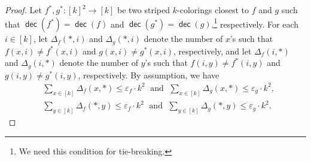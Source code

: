 \documentclass[11pt,fleqn]{article}
\renewcommand{\leq}{\leqslant}
\renewcommand{\epsilon}{\varepsilon}
\DeclareMathOperator{\dec}{\mathsf{dec}}
\newcommand{\f}{f}
\newcommand{\g}{g}
\theoremstyle{definition}
\numberwithin{equation}{section}
\begin{document}
\begin{proof} Let $\f^*, \g^* \colon [k]^2 \to [k]$ be two striped $k$-colorings
closest to $\f$ and $\g$ such that
$\dec(\f^*) = \dec(\f)$ and $\dec(\g^*) = \dec(\g)$,\footnote{
We need this condition for tie-breaking.
} respectively.
For each $i \in [k]$, let
    $\Delta_{\f}(*, i)$ and $\Delta_{\g}(*, i)$
    denote the number of $x$'s such that
    $\f(x,i) \neq \f^*(x,i)$ and $\g(x,i) \neq \g^*(x,i)$, respectively, and
    let
    $\Delta_{\f}(i,*)$ and $\Delta_{\g}(i,*)$
    denote the number of $y$'s such that
    $\f(i,y) \neq \f^*(i,y)$ and $\g(i,y) \neq \g^*(i,y)$, respectively.
By assumption, we have
\begin{align}
    & \sum_{x \in [k]} \Delta_{\f}(x,*) \leq \epsilon_{\f} \cdot k^2
    \;\text{ and }\;
    \sum_{x \in [k]} \Delta_{\g}(x,*) \leq \epsilon_{\g} \cdot k^2, \\
    & \sum_{y \in [k]} \Delta_{\f}(*, y) \leq \epsilon_{\f} \cdot k^2
    \;\text{ and }\;
    \sum_{y \in [k]} \Delta_{\g}(*, y) \leq \epsilon_{\g} \cdot k^2.
\end{align}



\end{proof}
\end{document}
